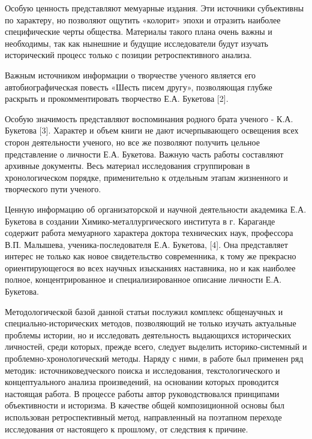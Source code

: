 Особую ценность представляют мемуарные издания. Эти источники
субъективны по характеру, но позволяют ощутить «колорит» эпохи и
отразить наиболее специфические черты общества. Материалы такого плана
очень важны и необходимы, так как нынешние и будущие исследователи будут
изучать исторический процесс только с позиции ретроспективного анализа.

Важным источником информации о творчестве ученого является его
автобиографическая повесть «Шесть писем другу», позволяющая глубже
раскрыть и прокомментировать творчество Е.А. Букетова {[}2{]}.

Особую значимость представляют воспоминания родного брата ученого - К.А.
Букетова {[}3{]}. Характер и объем книги не дают исчерпывающего
освещения всех сторон деятельности ученого, но все же позволяют получить
цельное представление о личности Е.А. Букетова. Важную часть работы
составляют архивные документы. Весь материал исследования сгруппирован в
хронологическом порядке, применительно к отдельным этапам жизненного и
творческого пути ученого.

Ценную информацию об организаторской и научной деятельности академика
Е.А. Букетова в создании Химико-металлургического института в г.
Караганде содержит работа мемуарного характера доктора технических наук,
профессора В.П. Малышева, ученика-последователя Е.А. Букетова, {[}4{]}.
Она представляет интерес не только как новое свидетельство современника,
к тому же прекрасно ориентирующегося во всех научных изысканиях
наставника, но и как наиболее полное, концентрированное и
специализированное описание личности Е.А. Букетова.

Методологической базой данной статьи послужил комплекс общенаучных и
специально-исторических методов, позволяющий не только изучать
актуальные проблемы истории, но и исследовать деятельность выдающихся
исторических личностей, среди которых, прежде всего, следует выделить
историко-системный и проблемно-хронологический методы. Наряду с ними, в
работе был применен ряд методик: источниковедческого поиска и
исследования, текстологического и концептуального анализа произведений,
на основании которых проводится настоящая работа. В процессе работы
автор руководствовался принципами объективности и историзма. В качестве
общей композиционной основы был использован ретроспективный метод,
направленный на поэтапном переходе исследования от настоящего к
прошлому, от следствия к причине.

